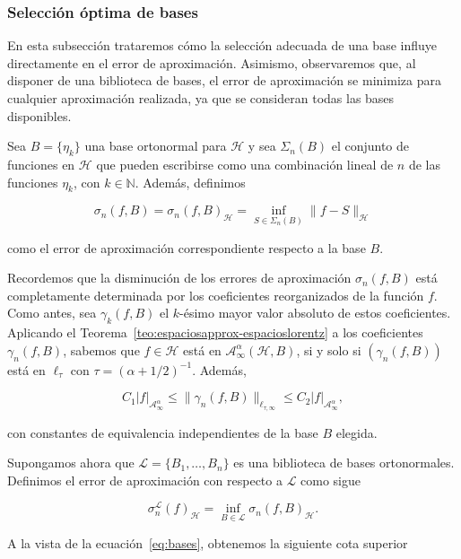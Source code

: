 \subsubsection{Selección óptima de bases}\label{subsubsec:seleccion-optima-bases}

En esta subsección trataremos cómo la selección adecuada de una base influye directamente en el error de aproximación. Asimismo, observaremos que, al disponer de una biblioteca de bases, el error de aproximación se minimiza para cualquier aproximación realizada, ya que se consideran todas las bases disponibles.

Sea $B = \{ \eta_k \}$ una base ortonormal para $\mathcal{H}$ y sea $\Sigma_n(B)$ el conjunto de funciones en $\mathcal{H}$ que pueden escribirse como una combinación lineal de $n$ de las funciones $\eta_k$, con $k \in \mathbb{N}$. Además, definimos

\[
    \sigma_n(f, B) = \sigma_n(f,B)_{\mathcal{H}} = \inf_{S \in \Sigma_n(B)} \| f - S \|_{\mathcal{H}}
\]

como el error de aproximación correspondiente respecto a la base $B$.

Recordemos que la disminución de los errores de aproximación $\sigma_n(f, B)$ está completamente determinada por los coeficientes reorganizados de la función $f$. Como antes, sea $\gamma_k(f, B)$ el $k$-ésimo mayor valor absoluto de estos coeficientes. Aplicando el Teorema~\ref{teo:espaciosapprox-espacioslorentz} a los coeficientes $\gamma_n(f, B)$, sabemos que $f \in \mathcal{H}$ está en $\mathcal{A}_\infty^\alpha (\mathcal{H}, B)$, si y solo si $(\gamma_n(f, B))$ está en $\ell_{\tau}$ con $\tau = (\alpha + 1/2)^{-1}$. Además, 

\begin{equation}\label{eq:bases}
    C_1 |f|_{\mathcal{A}_\infty^\alpha} \leq \| \gamma_n(f, B) \|_{\ell_{\tau, \infty}} \leq C_2 |f|_{\mathcal{A}_\infty^\alpha},
\end{equation}

con constantes de equivalencia independientes de la base $B$ elegida.

Supongamos ahora que $\mathcal{L} = \{ B_1, \ldots, B_n \}$ es una biblioteca de bases ortonormales. Definimos el error de aproximación con respecto a $\mathcal{L}$ como sigue

\[
    \sigma_n^{\mathcal{L}}(f)_{\mathcal{H}} = \inf_{B \in \mathcal{L}} \sigma_n(f, B)_{\mathcal{H}}.
\]

A la vista de la ecuación~\eqref{eq:bases}, obtenemos la siguiente cota superior

